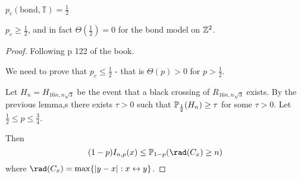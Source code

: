 
\begin{thm}
  \label{defn:random_walks_on_graphs:25}
  $p_{c}(\text{bond}, \mathbb{T}) = \frac{1}{2}$
\end{thm}

\begin{thm}
  \label{defn:random_walks_on_graphs:27}
  $p_{c} \geq \frac{1}{2}$, and in fact $\Theta(\frac{1}{2}) = 0$ for
  the bond model on $\mathbb{Z}^{2}$.
\end{thm}


\begin{proof}
  Following p 122 of the book.
  
  We need to prove that $p_{c} \leq \frac{1}{2}$ - that is $\Theta(p)
  > 0$ for $p > \frac{1}{2}$.


  Let $H_{n} = H_{16 n, n \sqrt{3}}$ be the event that a black
  crossing of $R_{16n, n \sqrt{3}}$ exists. By the previous lemma,s
  there exists $\tau > 0$ such that $\Prob_{\frac{1}{2}}(H_{n}) \geq
  \tau$ for some $\tau > 0$. Let $\frac{1}{2} \leq p \leq
  \frac{3}{4}$.

  Then
  \begin{equation}
    \label{eq:43}
    (1-p) I_{n, p}(x) \leq \Prob_{1-p}(\rad(C_{x}) \geq n)
  \end{equation}
  where $\rad(C_{x}) = \max \{ |y-x| : x \leftrightarrow y \}$.
\end{proof}

